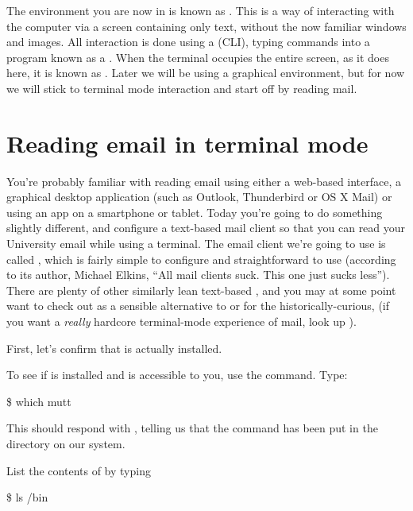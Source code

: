  The environment you are now in is known as . This is a way of interacting with  the computer via a screen containing only text, without the now familiar windows and images. All interaction is done using a  (CLI), typing commands into a program known as a . When the terminal occupies the entire screen, as it does here, it is known as .
 Later we will be using a graphical environment, but for now we will stick to terminal mode interaction and start off by reading mail.


\section{Reading email in terminal mode}

You're probably familiar with reading email using either a web-based interface, a graphical desktop application (such as Outlook, Thunderbird or OS X Mail) or using an app on a smartphone or tablet. Today you're going to do something slightly different, and configure a text-based mail client so that you can read your University email while using a terminal. The email client we're going to use is called , which is fairly simple to configure and straightforward to use (according to its author, Michael Elkins, ``All mail clients suck. This one just sucks less''). There are plenty of other similarly lean text-based , and you may at some point want to check out  as a sensible alternative to  or for the historically-curious,  (if you want a \textit{really} hardcore terminal-mode experience of mail, look up ).

First, let's confirm that  is actually installed.

To see if  is installed and is accessible to you, use the  command. Type:

\begin{ttoutenv}
\$ which mutt
\end{ttoutenv}

This should respond with , telling us that the  command has been put in the  directory on our system.

List the contents of  by typing
\begin{ttoutenv}
\$ ls /bin
\end{ttoutenv}

